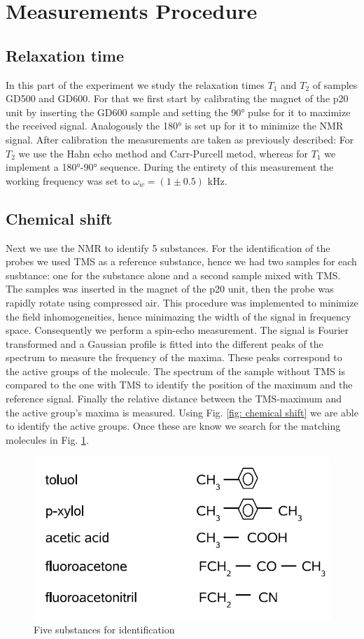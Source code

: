 \section{Measurements Procedure}
\subsection{Relaxation time}
In this part of the experiment we study the relaxation times $T_1$ and $T_2$ of samples GD500 and GD600. For that we first start by calibrating the magnet of the p20 unit by inserting the GD600 sample and setting the 90° pulse for it to maximize the received signal. Analogously the 180° is set up for it to minimize the NMR signal. 
After calibration the measurements are taken as previously described: For $T_2$ we use the Hahn echo method and Carr-Purcell metod, whereas for $T_1$ we implement a 180°-90° sequence. 
During the entirety of this measurement the working frequency was set to $\omega_w = (1 \pm 0.5)$ kHz.
\subsection{Chemical shift}
\label{sec: chemical shift}
Next we use the NMR to identify 5 substances. For the identification of the probes we used TMS as a reference substance, hence we had two samples for each susbtance: one for the substance alone and a second sample mixed with TMS.
The samples was inserted in the magnet of the p20 unit, then the probe was rapidly rotate using compressed air. This procedure was implemented to minimize the field inhomogeneities, hence minimazing the width of the signal in frequency space. Consequently we perform a spin-echo measurement. The signal is Fourier transformed and a Gaussian profile is fitted into the different peaks of the spectrum to measure the frequency of the maxima. These peaks correspond to the active groups of the molecule.
The spectrum of the sample without TMS is compared to the one with TMS to identify the position of the maximum and the reference signal. Finally the relative distance between the TMS-maximum and the active group's maxima is measured. Using Fig. \ref{fig: chemical shift} we are able to identify the active groups. Once these are know we search for the matching molecules in Fig. \ref{fig: identification}.
\begin{figure}[!htbp]
 \begin{center}
  \includegraphics[width = .6\textwidth]{Latex images/molecules.png}
  \caption[]{Five substances for identification \footnotemark}
    \label{fig: identification}
 \end{center}
\end{figure}
